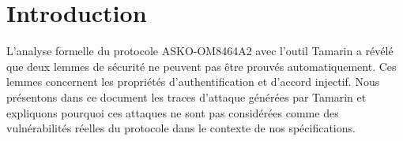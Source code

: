 \section{Introduction}

L'analyse formelle du protocole ASKO-OM8464A2 avec l'outil Tamarin a révélé que deux lemmes de
sécurité ne peuvent pas être prouvés automatiquement. Ces lemmes concernent les propriétés
d'authentification et d'accord injectif. Nous présentons dans ce document les traces d'attaque
générées par Tamarin et expliquons pourquoi ces attaques ne sont pas considérées comme des
vulnérabilités réelles du protocole dans le contexte de nos spécifications.
